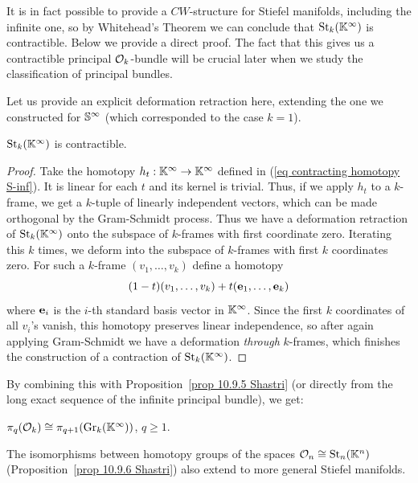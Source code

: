 \begin{rem}
    It is in fact possible to provide a $CW$-structure for Stiefel manifolds, including the infinite one, so by Whitehead's Theorem we can conclude that $\St_k(\bbK^\infty)$ is contractible. Below we provide a direct proof. The fact that this gives us a contractible principal $\calO_k$-bundle will be crucial later when we study the classification of principal bundles.
\end{rem}

Let us provide an explicit deformation retraction here, extending the one we constructed for $\bbS^\infty$ (which corresponded to the case $k=1$).
\begin{prop}
    $\St_k(\bbK^\infty)$ is contractible.
\end{prop}
\begin{proof}
    Take the homotopy $h_t:\bbK^\infty\to \bbK^\infty$ defined in (\ref{eq contracting homotopy S-inf}). It is linear for each $t$ and its kernel is trivial. Thus, if we apply $h_t$ to a $k$-frame, we get a $k$-tuple of linearly independent vectors, which can be made orthogonal by the Gram-Schmidt process. Thus we have a deformation retraction of $\St_k(\bbK^\infty)$ onto the subspace of $k$-frames with first coordinate zero. Iterating this $k$ times, we deform into the subspace of $k$-frames with first $k$ coordinates zero. For such a $k$-frame $(v_1,\ldots,v_k)$ define a homotopy
    \[(1-t)(v_1,\ldots,v_k)+t(\bf{e}_1,\ldots,\bf{e}_k)\]
    where $\bf{e}_i$ is the $i$-th standard basis vector in $\bbK^\infty$. Since the first $k$ coordinates of all $v_i$'s vanish, this homotopy preserves linear independence, so after again applying Gram-Schmidt we have a deformation \emph{through} $k$-frames, which finishes the construction of a contraction of $\St_k(\bbK^\infty)$.
\end{proof}
By combining this with Proposition~\ref{prop 10.9.5 Shastri} (or directly from the long exact sequence of the infinite principal bundle), we get:
\begin{cor}
   $\pi_q(\calO_k)\cong \pi_{q+1}(\Gr_k(\bbK^\infty))$, $q\geq 1$.
\end{cor}

The isomorphisms between homotopy groups of the spaces $\calO_n\cong \St_{n}(\bbK^n)$ (Proposition~\ref{prop 10.9.6 Shastri}) also extend to more general Stiefel manifolds. 

